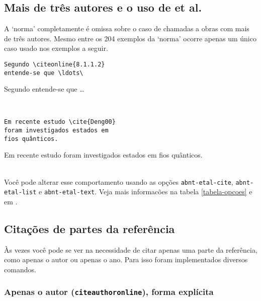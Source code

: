 \documentclass[espacosimples]{abnt}
\newcommand{\VerbL}{0.54\textwidth}
\newcommand{\LatL}{0.45\textwidth}
\begin{document}
\subsection{Mais de três autores e o uso de et al.}

A `norma' \cite{NBR10520:2001} completamente é omissa sobre o caso de chamadas a obras
com mais de três autores. Mesmo entre os 204 exemplos da `norma' \cite{NBR6023:2000}
ocorre apenas um único caso usado nos exemplos a seguir.

\noindent\begin{minipage}[t]{\VerbL}\small\begin{verbatim}
Segundo 
entende-se que \ldots\ 
\end{verbatim}\end{minipage}\begin{minipage}[t]{\LatL}\small
Segundo \citeonline{8.1.1.2}
entende-se que \ldots\ 
\end{minipage}\vspace{5mm}\\

\noindent\begin{minipage}[t]{\VerbL}\small\begin{verbatim}
Em recente estudo \cite{Deng00}
foram investigados estados em 
fios quânticos.
\end{verbatim}\end{minipage}\begin{minipage}[t]{\LatL}\small
Em recente estudo \cite{Deng00}
foram investigados estados em 
fios quânticos.
\end{minipage}\vspace{5mm}\\

Você pode alterar esse comportamento usando as opções {\tt abnt-etal-cite},
{\tt abnt-etal-list} e {\tt abnt-etal-text}.
Veja mais informacões na tabela \ref{tabela-opcoes} e em \cite{abnt-bibtex-doc}.

\subsection{Citações de partes da referência}

Às vezes você pode se ver na necessidade de citar apenas uma parte
da referência, como apenas o autor ou apenas o ano.
Para isso foram implementados diversos comandos.

\subsubsection{Apenas o autor ({\tt citeauthoronline}), forma explícita}
\end{document}
